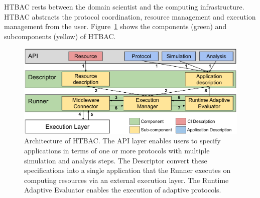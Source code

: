 







HTBAC rests between the domain scientist and the computing infrastructure.
HTBAC abstracts the protocol coordination, resource management and execution
management from the user. Figure~\ref{fig:architecture} shows the components
(green) and subcomponents (yellow) of HTBAC.

\begin{figure}
  \centering
  \includegraphics[width=\columnwidth]{figures/HTBAC_architecture_model.pdf}
  \caption{Architecture of HTBAC. The API layer enables users to specify
  applications in terms of one or more protocols with multiple simulation and
  analysis steps. The Descriptor convert these specifications into a single
  application that the Runner executes on computing resources via an external
  execution layer. The Runtime Adaptive Evaluator enables the execution of
  adaptive protocols.}
\label{fig:architecture}
\end{figure}


